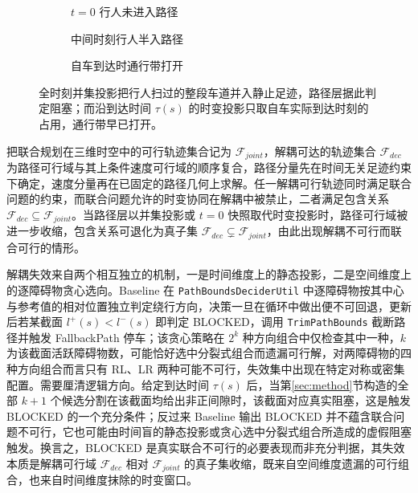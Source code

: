 \documentclass[a4paper,zihao=5]{ctexart}
\theoremstyle{definition}
\begin{document}
\begin{figure}[htbp]
\centering
\begin{subfigure}[b]{0.30\textwidth}
  \centering
  \caption{$t{=}0$ 行人未进入路径}
\end{subfigure}\hfill
\begin{subfigure}[b]{0.30\textwidth}
  \centering
  \caption{中间时刻行人半入路径}
\end{subfigure}\hfill
\begin{subfigure}[b]{0.30\textwidth}
  \centering
  \caption{自车到达时通行带打开}
\end{subfigure}
\caption{横穿行人场景下的时间盲信息断裂}
\caption*{全时刻并集投影把行人扫过的整段车道并入静止足迹，路径层据此判定阻塞；而沿到达时间 $\tau(s)$ 的时变投影只取自车实际到达时刻的占用，通行带早已打开。}
\label{fig:dynamic_exclusion}
\end{figure}

把联合规划在三维时空中的可行轨迹集合记为 $\mathcal{F}_{joint}$，解耦可达的轨迹集合 $\mathcal{F}_{dec}$ 为路径可行域与其上条件速度可行域的顺序复合，路径分量先在时间无关足迹约束下确定，速度分量再在已固定的路径几何上求解。任一解耦可行轨迹同时满足联合问题的约束，而联合问题允许的时变协同在解耦中被禁止，二者满足包含关系 $\mathcal{F}_{dec} \subseteq \mathcal{F}_{joint}$。当路径层以并集投影或 $t{=}0$ 快照取代时变投影时，路径可行域被进一步收缩，包含关系可退化为真子集 $\mathcal{F}_{dec} \subsetneq \mathcal{F}_{joint}$，由此出现解耦不可行而联合可行的情形。

解耦失效来自两个相互独立的机制，一是时间维度上的静态投影，二是空间维度上的逐障碍物贪心选向。Baseline 在 \texttt{PathBoundsDeciderUtil} 中逐障碍物按其中心与参考值的相对位置独立判定绕行方向，决策一旦在循环中做出便不可回退，更新后若某截面 $l^{+}(s) < l^{-}(s)$ 即判定 BLOCKED，调用 \texttt{TrimPathBounds} 截断路径并触发 FallbackPath 停车；该贪心策略在 $2^k$ 种方向组合中仅检查其中一种，$k$ 为该截面活跃障碍物数，可能恰好选中分裂式组合而遗漏可行解，对两障碍物的四种方向组合而言只有 RL、LR 两种可能不可行，失效集中出现在特定对称或密集配置。需要厘清逻辑方向。给定到达时间 $\tau(s)$ 后，当第\ref{sec:method}节构造的全部 $k+1$ 个候选分割在该截面均给出非正间隙时，该截面对应真实阻塞，这是触发 BLOCKED 的一个充分条件；反过来 Baseline 输出 BLOCKED 并不蕴含联合问题不可行，它也可能由时间盲的静态投影或贪心选中分裂式组合所造成的虚假阻塞触发。换言之，BLOCKED 是真实联合不可行的必要表现而非充分判据，其失效本质是解耦可行域 $\mathcal{F}_{dec}$ 相对 $\mathcal{F}_{joint}$ 的真子集收缩，既来自空间维度遗漏的可行组合，也来自时间维度抹除的时变窗口。
\end{document}
